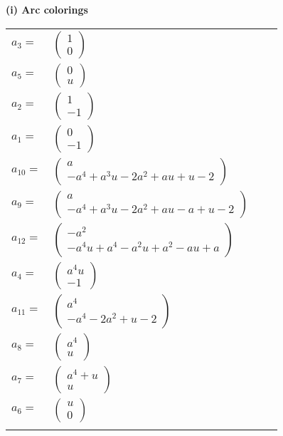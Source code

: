 \documentclass[1p]{elsarticle_modified}
\theoremstyle{definition}
\begin{document}
\flushleft \textbf{(i) Arc colorings}\\
\begin{tabular}{m{7pt} m{180pt} m{7pt} m{180pt} }
\flushright $a_{3}=$&$\begin{pmatrix}1\\0\end{pmatrix}$ \\
\flushright $a_{5}=$&$\begin{pmatrix}0\\u\end{pmatrix}$ \\
\flushright $a_{2}=$&$\begin{pmatrix}1\\-1\end{pmatrix}$ \\
\flushright $a_{1}=$&$\begin{pmatrix}0\\-1\end{pmatrix}$ \\
\flushright $a_{10}=$&$\begin{pmatrix}a\\- a^4+a^3 u-2 a^2+a u+u-2\end{pmatrix}$ \\
\flushright $a_{9}=$&$\begin{pmatrix}a\\- a^4+a^3 u-2 a^2+a u- a+u-2\end{pmatrix}$ \\
\flushright $a_{12}=$&$\begin{pmatrix}- a^2\\- a^4 u+a^4- a^2 u+a^2- a u+a\end{pmatrix}$ \\
\flushright $a_{4}=$&$\begin{pmatrix}a^4 u\\-1\end{pmatrix}$ \\
\flushright $a_{11}=$&$\begin{pmatrix}a^4\\- a^4-2 a^2+u-2\end{pmatrix}$ \\
\flushright $a_{8}=$&$\begin{pmatrix}a^4\\u\end{pmatrix}$ \\
\flushright $a_{7}=$&$\begin{pmatrix}a^4+u\\u\end{pmatrix}$ \\
\flushright $a_{6}=$&$\begin{pmatrix}u\\0\end{pmatrix}$\\&\end{tabular}
\end{document}
